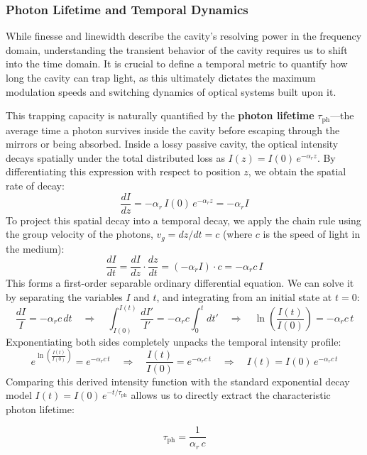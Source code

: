 \subsubsection{Photon Lifetime and Temporal Dynamics}

While finesse and linewidth describe the cavity's resolving power in the frequency domain, understanding the transient behavior of the cavity requires us to shift into the time domain. It is crucial to define a temporal metric to quantify how long the cavity can trap light, as this ultimately dictates the maximum modulation speeds and switching dynamics of optical systems built upon it.

This trapping capacity is naturally quantified by the \textbf{photon lifetime} $\tau_{\text{ph}}$---the average time a photon survives inside the cavity before escaping through the mirrors or being absorbed. Inside a lossy passive cavity, the optical intensity decays spatially under the total distributed loss as $I(z) = I(0)\,e^{-\alpha_r z}$. By differentiating this expression with respect to position $z$, we obtain the spatial rate of decay:
\begin{equation*}
    \frac{dI}{dz} = -\alpha_r\,I(0)\,e^{-\alpha_r z} = -\alpha_r I
\end{equation*}
To project this spatial decay into a temporal decay, we apply the chain rule using the group velocity of the photons, $v_g = dz/dt = c$ (where $c$ is the speed of light in the medium):
\begin{equation*}
    \frac{dI}{dt} = \frac{dI}{dz}\cdot\frac{dz}{dt} = (-\alpha_r I)\cdot c = -\alpha_r c\,I
\end{equation*}
This forms a first-order separable ordinary differential equation. We can solve it by separating the variables $I$ and $t$, and integrating from an initial state at $t=0$:
\begin{equation*}
    \frac{dI}{I} = -\alpha_r c\, dt \quad \Rightarrow \quad \int_{I(0)}^{I(t)} \frac{dI'}{I'} = -\alpha_r c \int_0^t dt' \quad \Rightarrow \quad \ln\left(\frac{I(t)}{I(0)}\right) = -\alpha_r c\,t
\end{equation*}
Exponentiating both sides completely unpacks the temporal intensity profile:
\begin{equation*}
    e^{\ln\left(\frac{I(t)}{I(0)}\right)} = e^{-\alpha_r c\,t} \quad \Rightarrow \quad \frac{I(t)}{I(0)} = e^{-\alpha_r c\,t} \quad \Rightarrow \quad I(t) = I(0)\,e^{-\alpha_r c\,t}
\end{equation*}
Comparing this derived intensity function with the standard exponential decay model $I(t) = I(0)\,e^{-t/\tau_{\text{ph}}}$ allows us to directly extract the characteristic photon lifetime:
\begin{keyresult}
    \begin{equation}
        \tau_{\text{ph}} = \frac{1}{\alpha_r\,c}
    \end{equation}
\end{keyresult}

